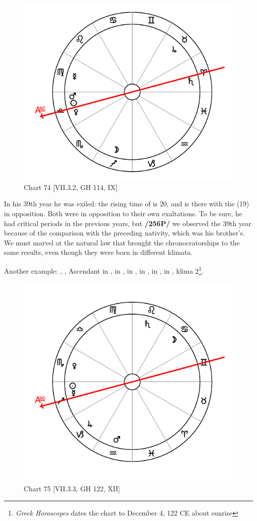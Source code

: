 \begin{figure}
\centering
\vspace{-20pt}
\includegraphics[width=.68\textwidth]{charts/7_3_2}
\caption{Chart 74 [VII.3.2, GH 114, IX]}
\label{fig:chart74}
\end{figure}

In his 39th year he was exiled: the rising time of \Aries\xspace is 20, and \Saturn\xspace is there with the \Sun\xspace (19) in opposition. Both were in opposition to their own exaltations. To be sure, he had critical periods in the previous years, but \textbf{/256P/} we observed the 39th year because of the comparison with the preceding nativity, which was his brother’s. We must marvel at the natural law that brought the chronocratorships to the same results, even though they were born in different klimata.

\newpage
Another example: \Sun, \Mercury, Ascendant in \Sagittarius, \Moon\xspace in \Cancer, \Saturn\xspace in \Leo, \Jupiter\xspace in
\Capricorn, \Mars\xspace in \Aquarius, \Venus\xspace in \Scorpio, klima 2\footnote{\textit{Greek Horoscopes} dates the chart to December 4, 122 CE about sunrise}.

\begin{figure}
\centering
\vspace{-20pt}
\includegraphics[width=.68\textwidth]{charts/7_3_3}
\caption{Chart 75 [VII.3.3, GH 122, XII]}
\label{fig:chart75}
\end{figure}


